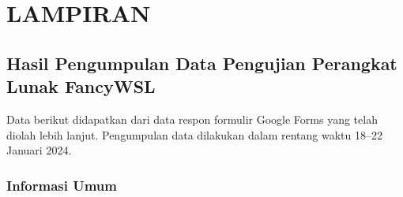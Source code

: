\chapter*{LAMPIRAN}

\section{Hasil Pengumpulan Data Pengujian Perangkat Lunak FancyWSL}

Data berikut didapatkan dari data respon formulir Google Forms yang telah diolah lebih lanjut. Pengumpulan data dilakukan dalam rentang waktu 18--22 Januari 2024.

\subsection{Informasi Umum}

